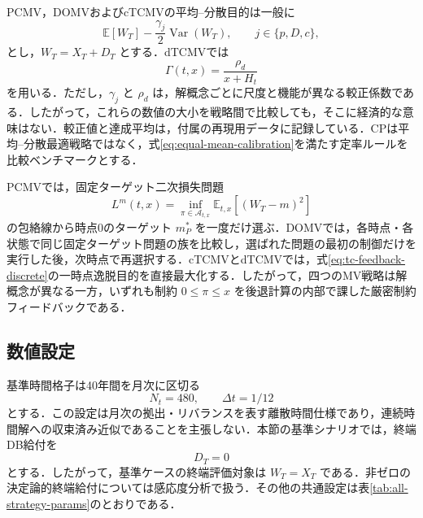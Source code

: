\documentclass[10pt,a4paper]{article}
\theoremstyle{plain}
\theoremstyle{definition}
\newcommand{\E}{\mathbb{E}}
\DeclareMathOperator{\Var}{Var}
\begin{document}
PCMV，DOMVおよびcTCMVの平均--分散目的は一般に
\begin{equation}
  \E[W_T]-\frac{\gamma_j}{2}\Var(W_T),
  \qquad j\in\{p,D,c\},
  \label{eq:common-mv-gamma}
\end{equation}
とし，$W_T=X_T+D_T$ とする．dTCMVでは
\begin{equation}
  \Gamma(t,x)=\frac{\rho_d}{x+H_t}
\end{equation}
を用いる．ただし，$\gamma_j$ と $\rho_d$ は，解概念ごとに尺度と機能が異なる較正係数である．したがって，これらの数値の大小を戦略間で比較しても，そこに経済的な意味はない．較正値と達成平均は，付属の再現用データに記録している．CPは平均--分散最適戦略ではなく，式\eqref{eq:equal-mean-calibration}を満たす定率ルールを比較ベンチマークとする．

PCMVでは，固定ターゲット二次損失問題
\begin{equation}
  L^m(t,x)=\inf_{\pi\in\mathcal A_{t,x}}\E_{t,x}[(W_T-m)^2]
\end{equation}
の包絡線から時点0のターゲット $m_P^*$ を一度だけ選ぶ．DOMVでは，各時点・各状態で同じ固定ターゲット問題の族を比較し，選ばれた問題の最初の制御だけを実行した後，次時点で再選択する．cTCMVとdTCMVでは，式\eqref{eq:tc-feedback-discrete}の一時点逸脱目的を直接最大化する．したがって，四つのMV戦略は解概念が異なる一方，いずれも制約 $0\leq\pi\leq x$ を後退計算の内部で課した厳密制約フィードバックである．

\subsection{数値設定}

基準時間格子は40年間を月次に区切る
\[
  N_t=480,\qquad \Delta t=1/12
\]
とする．この設定は月次の拠出・リバランスを表す離散時間仕様であり，連続時間解への収束済み近似であることを主張しない．本節の基準シナリオでは，終端DB給付を
\[
  D_T=0
\]
とする．したがって，基準ケースの終端評価対象は $W_T=X_T$ である．非ゼロの決定論的終端給付については感応度分析で扱う．その他の共通設定は表\ref{tab:all-strategy-params}のとおりである．
\end{document}
